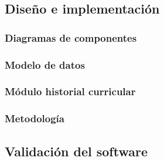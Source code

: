 \subsection{Diseño e implementación}
	\subsubsection{Diagramas de componentes}
	\subsubsection{Modelo de datos}
	\subsubsection{Módulo historial curricular}
	\subsubsection{Metodología}
	
\subsection{Validación del software}
